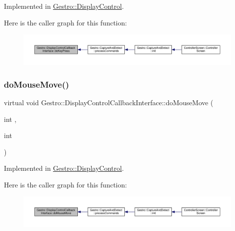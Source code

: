 Implemented in \hyperlink{class_gestro_1_1_display_control_aa5af48425f7ba40012b2a7db5fabed45}{Gestro\+::\+Display\+Control}.

Here is the caller graph for this function\+:
\nopagebreak
\begin{figure}[H]
\begin{center}
\leavevmode
\includegraphics[width=350pt]{class_gestro_1_1_display_control_callback_interface_aa6d1e75bb4b3aa0b0e10497576b1053f_icgraph}
\end{center}
\end{figure}
\mbox{\label{class_gestro_1_1_display_control_callback_interface_a35d453c78b578d061c89c95b3ae9ee8a}} 
\subsubsection{\texorpdfstring{do\+Mouse\+Move()}{doMouseMove()}}
{\footnotesize\ttfamily virtual void Gestro\+::\+Display\+Control\+Callback\+Interface\+::do\+Mouse\+Move (\begin{DoxyParamCaption}\item[{int}]{,  }\item[{int}]{ }\end{DoxyParamCaption})\hspace{0.3cm}{\ttfamily [pure virtual]}}



Implemented in \hyperlink{class_gestro_1_1_display_control_aa8c509a1e17ba12d164dcfe43cf281d4}{Gestro\+::\+Display\+Control}.

Here is the caller graph for this function\+:
\nopagebreak
\begin{figure}[H]
\begin{center}
\leavevmode
\includegraphics[width=350pt]{class_gestro_1_1_display_control_callback_interface_a35d453c78b578d061c89c95b3ae9ee8a_icgraph}
\end{center}
\end{figure}
\mbox{\label{class_gestro_1_1_display_control_callback_interface_ab660632d549760b0404388fc8e86714a}} 
